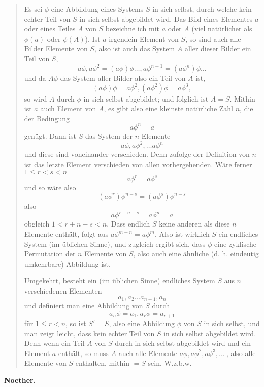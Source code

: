 \documentclass[leqno,hidelinks]{article}
\theoremstyle{definition}
\begin{document}
\begin{paracol}{2}
\begin{quote}
\hspace{12pt} Es sei $\phi$ eine Abbildung eines Systems $S$ in sich selbst, durch
welche kein echter Teil von $S$ in sich selbst abgebildet wird. Das Bild eines
Elementes $a$ oder eines Teiles $A$ von $S$ bezeichne ich mit $a$ oder $A$ (viel
natürlicher als $\phi(a)$ oder $\phi(A)$). Ist $a$ irgendein Element von $S$, so
sind auch alle Bilder Elemente von $S$, also ist auch das System $A$ aller dieser
Bilder ein Teil von $S$,
\[
	a\phi, a\phi^2= (a\phi)\phi \ldots, a\phi^{n+1} = (a\phi^n)\phi \ldots
\]
und da $A\phi$  das System aller Bilder also ein Teil von $A$ ist,
\[
	(a\phi) \phi = a\phi^2, (a\phi^2)\phi = a\phi^3,
\]
so wird $A$ durch $\phi$ in sich selbst abgebildet; und folglich ist $A = S$.
Mithin ist $a$ auch Element von $A$,  es gibt also eine kleinste natürliche Zahl
$n$, die der Bedingung
\[
	a\phi^n = a
\]
genügt. Dann ist $S$ das System der $n$ Elemente
\[
	a\phi,a\phi^2,\ldots a\phi^n
\]
und diese sind voneinander verschieden. Denn zufolge der Definition von $n$ ist das
letzte Element verschieden von allen vorhergehenden. Wäre ferner $1 \leq r<s < n$
\[
	a\phi^r = a\phi^s
\]
und so wäre also
\[
	(a\phi^r)\phi^{n-s} = (a\phi^s) \phi^{n-s}
\]
also
\[
	a\phi^{r+n-s} = a\phi^n=a
\]
obgleich $1<r+n-s<n$. Dass endlich $S$ keine anderen als diese $n$ Elemente enthält,
folgt aus $a\phi^{m + n} = a\phi^m$. Also ist wirklich $S$ ein endliches System
(im üblichen Sinne), und zugleich ergibt sich, dass $\phi$ eine zyklische Permutation
der $n$ Elemente von $S$, also auch eine ähnliche (d. h. eindeutig umkehrbare)
Abbildung ist.

\hspace{12pt} Umgekehrt, besteht ein (im üblichen Sinne) endliches System $S$ aus
$n$ verschiedenen Elementen
\[
	a_1, a_2 \ldots a_{n-1}, a_n
\]
und definiert man eine Abbildung von $S$ durch
\[
a_n\phi = a_1, a_r\phi=a_{r+1}
\]
für $1\leq r<n$, so ist $S' = S$, also eine Abbildung $\phi$ von $S$ in sich selbst,
und man zeigt leicht, dass kein echter Teil von $S$ in sich selbst abgebildet wird.
Denn wenn ein Teil $A$ von $S$ durch  in sich selbst abgebildet wird und ein Element
$a$ enthält, so muss $A$ auch alle Elemente $a\phi, a\phi^2, a\phi^3, \ldots\ $,
also alle Elemente von $S$ enthalten, mithin $= S$ sein. W.z.b.w.\grqq{}
\end{quote}

\vspace{-20pt} \begin{flushright} \textbf{Noether.}\end{flushright}



\end{paracol}
\end{document}
